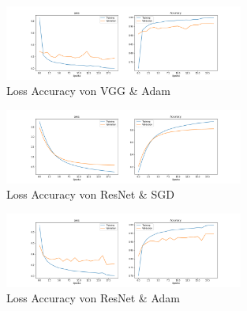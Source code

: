 \documentclass[sigconf]{acmart}
\begin{document}
\begin{figure}[H]
  \includegraphics[width=0.7\textwidth]{images/Loss_Acc_VGG_Adam}
  \caption{Loss Accuracy von VGG \& Adam}
  \Description{}
  \label{fig:VGG_Adam}
\end{figure} 

\begin{figure}[H]
  \includegraphics[width=0.7\textwidth]{images/Loss_Acc_ResNet_SGD}
  \caption{Loss Accuracy von ResNet \& SGD}
  \Description{}
  \label{fig:ResNet_SGD}
\end{figure} 

\begin{figure}[H]
  \includegraphics[width=0.7\textwidth]{images/Loss_Acc_ResNet_Adam}
  \caption{Loss Accuracy von ResNet \& Adam}
  \Description{}
  \label{fig:ResNet_Adam}
\end{figure} 
\end{document}
